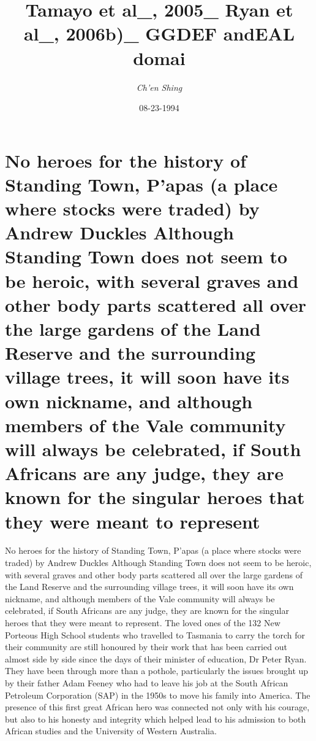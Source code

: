 \documentclass{article}%
\title{Tamayo et al\_, 2005\_ Ryan et al\_, 2006b)\_ GGDEF andEAL domai}%
\author{\textit{Ch'en Shing}}%
\date{08-23-1994}%
\begin{document}
%
\normalsize%
\maketitle%
\section{No heroes for the history of Standing Town, P'apas (a place where stocks were traded)\newline%
by Andrew Duckles\newline%
Although Standing Town does not seem to be heroic, with several graves and other body parts scattered all over the large gardens of the Land Reserve and the surrounding village trees, it will soon have its own nickname, and although members of the Vale community will always be celebrated, if South Africans are any judge, they are known for the singular heroes that they were meant to represent}%
\label{sec:NoheroesforthehistoryofStandingTown,Papas(aplacewherestocksweretraded)byAndrewDucklesAlthoughStandingTowndoesnotseemtobeheroic,withseveralgravesandotherbodypartsscatteredalloverthelargegardensoftheLandReserveandthesurroundingvillagetrees,itwillsoonhaveitsownnickname,andalthoughmembersoftheValecommunitywillalwaysbecelebrated,ifSouthAfricansareanyjudge,theyareknownforthesingularheroesthattheyweremeanttorepresent}%
No heroes for the history of Standing Town, P'apas (a place where stocks were traded)\newline%
by Andrew Duckles\newline%
Although Standing Town does not seem to be heroic, with several graves and other body parts scattered all over the large gardens of the Land Reserve and the surrounding village trees, it will soon have its own nickname, and although members of the Vale community will always be celebrated, if South Africans are any judge, they are known for the singular heroes that they were meant to represent.\newline%
The loved ones of the 132 New Porteous High School students who travelled to Tasmania to carry the torch for their community are still honoured by their work that has been carried out almost side by side since the days of their minister of education, Dr Peter Ryan.\newline%
They have been through more than a pothole, particularly the issues brought up by their father Adam Feeney who had to leave his job at the South African Petroleum Corporation (SAP) in the 1950s to move his family into America. The presence of this first great African hero was connected not only with his courage, but also to his honesty and integrity which helped lead to his admission to both African studies and the University of Western Australia.\newline%
\end{document}

